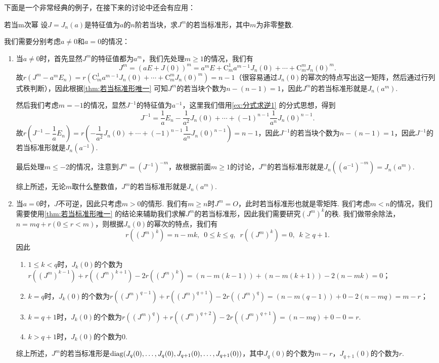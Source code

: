 下面是一个非常经典的例子，在接下来的讨论中还会有应用：
\begin{example}{}{若当m次幂}
    设$J=J_n(a)$是特征值为$a$的$n$阶若当块，求$J^m$的若当标准形，其中$m$为非零整数.
\end{example}
\begin{solution}
    我们需要分别考虑$a\neq 0$和$a=0$的情况：
    \begin{enumerate}
        \item 当$a\neq 0$时，首先显然$J^m$的特征值都为$a^m$，我们先处理$m\geqslant 1$的情况，我们有
              \[J^m=(aE+J(0))^m=a^mE+\mathrm{C}_m^1a^{m-1}J_n(0)+\cdots+\mathrm{C}_m^mJ_n(0)^m.\]
              故$r(J^m-a^mE_n)=r(\mathrm{C}_m^1a^{m-1}J_n(0)+\cdots+\mathrm{C}_m^mJ_n(0)^m)=n-1$（很容易通过$J_n(0)$的幂次的特点写出这一矩阵，然后通过行列式秩判断），因此根据\autoref{thm:若当标准形唯一} 可知$J^m$的若当块个数为$n-(n-1)=1$，因此$J^m$的若当标准形就是$J_n(a^m)$.

              然后我们考虑$m=-1$的情况，显然$J^{-1}$的特征值为$a^{-1}$，这里我们借用\autoref{ex:分式求逆1} 的分式思想，得到
              \[J^{-1}=\dfrac{1}{a}E_n-\dfrac{1}{a^2}J_n(0)+\cdots+(-1)^{n-1}\dfrac{1}{a^n}J_n(0)^{n-1}.\]
              故$r(J^{-1}-\dfrac{1}{a}E_n)=r(-\dfrac{1}{a^2}J_n(0)+\cdots+(-1)^{n-1}\dfrac{1}{a^n}J_n(0)^{n-1})=n-1$，因此$J^{-1}$的若当块个数为$n-(n-1)=1$，因此$J^{-1}$的若当标准形就是$J_n(a^{-1})$.

              最后处理$m\leqslant -2$的情况，注意到$J^m=(J^{-1})^{-m}$，故根据前面$m\geqslant 1$的讨论，$J^m$的若当标准形就是$J_n((a^{-1})^{-m})=J_n(a^m)$.

              综上所述，无论$m$取什么整数值，$J^m$的若当标准形就是$J_n(a^m)$.

        \item 当$a=0$时，$J$不可逆，因此只考虑$m>0$的情形. 我们有$m\geqslant n$时$J^m=O$，此时若当标准形也就是零矩阵. 我们考虑$m<n$的情况，我们需要使用\autoref{thm:若当标准形唯一} 的结论来辅助我们求解$J^m$的若当标准形，因此我们需要研究$(J^m)^k$的秩. 我们做带余除法，$n=mq+r(0\leqslant r<m)$，则根据$J_n(0)$的幂次的特点，我们有
              \[r((J^m)^k)=n-mk,\enspace 0\leqslant k\leqslant q,\enspace r((J^m)^k)=0,\enspace k\geqslant q+1.\]
              因此
              \begin{enumerate}
                  \item $1\leqslant k<q$时，$J_k(0)$的个数为$r((J^m)^{k-1})+r((J^m)^{k+1})-2r((J^m)^k)=(n-m(k-1))+(n-m(k+1))-2(n-mk)=0$；
                  \item $k=q$时，$J_k(0)$的个数为$r((J^m)^{q-1})+r((J^m)^{q+1})-2r((J^m)^q)=(n-m(q-1))+0-2(n-mq)=m-r$；
                  \item $k=q+1$时，$J_k(0)$的个数为$r((J^m)^q)+r((J^m)^{q+2})-2r((J^m)^{q+1})=(n-mq)+0-0=r$.
                  \item $k>q+1$时，$J_k(0)$的个数为0.
              \end{enumerate}
              综上所述，$J^m$的若当标准形是$\operatorname{diag}(J_q(0),\ldots,J_q(0),J_{q+1}(0),\ldots,J_{q+1}(0))$，其中$J_q(0)$的个数为$m-r$，$J_{q+1}(0)$的个数为$r$.
    \end{enumerate}
\end{solution}

